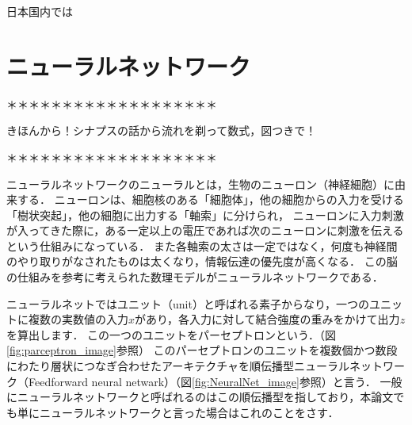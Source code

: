 \documentclass[a4j,11pt,report]{jsbook}
\begin{document}
日本国内では

\section{ニューラルネットワーク}

＊＊＊＊＊＊＊＊＊＊＊＊＊＊＊＊＊＊＊

きほんから！シナプスの話から流れを剃って数式，図つきで！

＊＊＊＊＊＊＊＊＊＊＊＊＊＊＊＊＊＊＊

ニューラルネットワークのニューラルとは，生物のニューロン（神経細胞）に由来する．
ニューロンは、細胞核のある「細胞体」，他の細胞からの入力を受ける「樹状突起」，他の細胞に出力する「軸索」に分けられ，
ニューロンに入力刺激が入ってきた際に，ある一定以上の電圧であれば次のニューロンに刺激を伝えるという仕組みになっている．
また各軸索の太さは一定ではなく，何度も神経間のやり取りがなされたものは太くなり，情報伝達の優先度が高くなる．
この脳の仕組みを参考に考えられた数理モデルがニューラルネットワークである．

ニューラルネットではユニット（unit）と呼ばれる素子からなり，一つのユニットに複数の実数値の入力$x$があり，各入力に対して結合強度の重みをかけて出力$z$を算出します．
この一つのユニットをパーセプトロンという．（図\ref{fig:parceptron_image}参照）
このパーセプトロンのユニットを複数個かつ数段にわたり層状につなぎ合わせたアーキテクチャを順伝播型ニューラルネットワーク（Feedforward neural netwark）（図\ref{fig:NeuralNet_image}参照）と言う．
一般にニューラルネットワークと呼ばれるのはこの順伝播型を指しており，本論文でも単にニューラルネットワークと言った場合はこれのことをさす．
\end{document}
